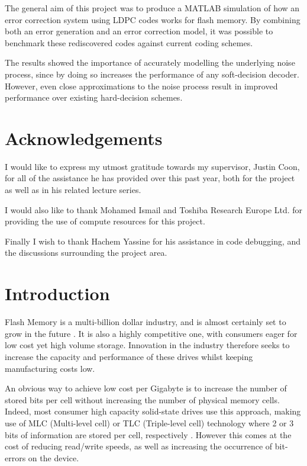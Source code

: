 \documentclass[11pt]{article}
\numberwithin{equation}{subsection}
\begin{document}
The general aim of this project was to produce a MATLAB simulation of how an error correction system using LDPC codes works for flash memory.  By combining both an error generation and an error correction model, it was possible to benchmark these rediscovered codes against current coding schemes.

The results showed the importance of accurately modelling the underlying noise process, since by doing so increases the performance of any soft-decision decoder. However, even close approximations to the noise process result in improved performance over existing hard-decision schemes.

\section*{Acknowledgements}
I would like to express my utmost gratitude towards my supervisor, Justin Coon, for all of the assistance he has provided over this past year, both for the project as well as in his related lecture series.

I would also like to thank Mohamed Ismail and Toshiba Research Europe Ltd. for providing the use of compute resources for this project.

Finally I wish to thank Hachem Yassine for his assistance in code debugging, and the discussions surrounding the project area.

\singlespacing
\tableofcontents
\doublespacing
\section{Introduction}
Flash Memory is a multi-billion dollar industry, and is almost certainly set to grow in the future \cite{dong2012estimating}. It is also a highly competitive one, with consumers eager for low cost yet high volume storage. Innovation in the industry therefore seeks to increase the capacity and performance of these drives whilst keeping manufacturing costs low. 

An obvious way to achieve low cost per Gigabyte is to increase the number of stored bits per cell without increasing the number of physical memory cells. Indeed, most consumer high capacity solid-state drives use this approach, making use of MLC (Multi-level cell) or TLC (Triple-level cell) technology where 2 or 3 bits of information are stored per cell, respectively \cite{dong2012estimating}. However this comes at the cost of reducing read/write speeds, as well as increasing the occurrence of bit-errors on the device. 
\end{document}
